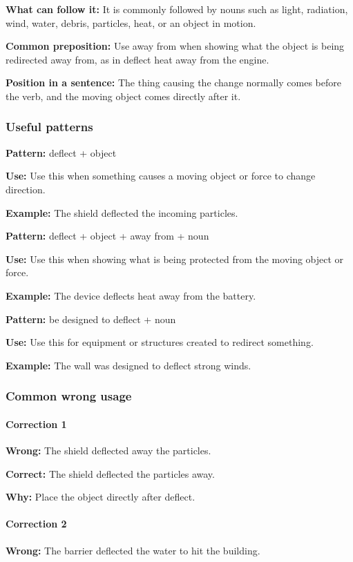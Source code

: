 \documentclass[11pt]{article}
\begin{document}
\textbf{What can follow it:} It is commonly followed by nouns such as light, radiation, wind, water, debris, particles, heat, or an object in motion.

\textbf{Common preposition:} Use away from when showing what the object is being redirected away from, as in deflect heat away from the engine.

\textbf{Position in a sentence:} The thing causing the change normally comes before the verb, and the moving object comes directly after it.

\subsubsection{Useful patterns}
\textbf{Pattern:} deflect + object

\textbf{Use:} Use this when something causes a moving object or force to change direction.

\textbf{Example:} The shield deflected the incoming particles.

\textbf{Pattern:} deflect + object + away from + noun

\textbf{Use:} Use this when showing what is being protected from the moving object or force.

\textbf{Example:} The device deflects heat away from the battery.

\textbf{Pattern:} be designed to deflect + noun

\textbf{Use:} Use this for equipment or structures created to redirect something.

\textbf{Example:} The wall was designed to deflect strong winds.

\subsubsection{Common wrong usage}
\paragraph{Correction 1}
\textbf{Wrong:} The shield deflected away the particles.

\textbf{Correct:} The shield deflected the particles away.

\textbf{Why:} Place the object directly after deflect.

\paragraph{Correction 2}
\textbf{Wrong:} The barrier deflected the water to hit the building.
\end{document}
